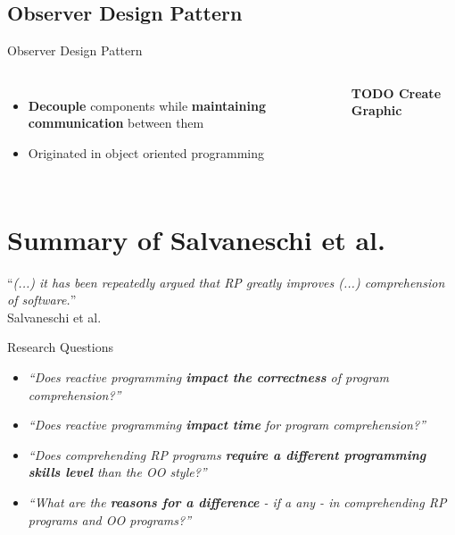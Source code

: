 \documentclass{beamer}
\begin{document}
\subsection*{Observer Design Pattern}
\begin{frame}{Observer Design Pattern \cite{gamma1995design}}
	\begin{columns}[t, onlytextwidth]
			\begin{itemize}
				\item \textbf{Decouple} components while \textbf{maintaining communication} between them\bigskip
				\item Originated in object oriented programming\bigskip
			\end{itemize}

			\textbf{TODO Create Graphic}
	\end{columns}
\end{frame}



\section{Summary of Salvaneschi et al.}

\begin{frame}[focus]
	``\emph{(...) it has been repeatedly argued that RP greatly improves (...) comprehension of software.}''
	\\\bigskip
	\small{Salvaneschi et al. \cite{7827078}}
\end{frame}

\begin{frame}{Research Questions \cite{7827078}}
	\begin{itemize}
		\item \emph{``Does reactive programming \textbf{impact the correctness} of program comprehension?''}\bigskip
		\item \emph{``Does reactive programming \textbf{impact time} for program comprehension?''}\bigskip
		\item \emph{``Does comprehending RP programs \textbf{require a different programming skills level} than the OO style?''}\bigskip
		\item \emph{``What are the \textbf{reasons for a difference} - if a any - in comprehending RP programs and OO programs?''}
	\end{itemize}
\end{frame}
\end{document}
